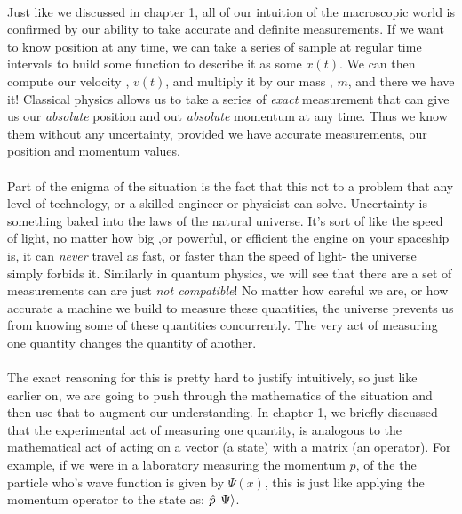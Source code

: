 \documentclass[12pt,letterpaper]{book}
\begin{document}
\paragraph*{}Just like we discussed in chapter 1, all of our intuition of the macroscopic world is confirmed by our ability to take accurate and definite measurements. If we want to know position at any time, we can take a series of sample at regular time intervals to build some function to describe it as some $x(t)$. We can then compute our velocity , $v(t)$, and multiply it by our mass , $m$, and there we have it! Classical physics allows us to take a series of \textit{exact} measurement that can give us our \textit{absolute} position and out \textit{absolute} momentum at any time. Thus we know them without any uncertainty, provided we have accurate measurements, our position and momentum values.

\paragraph*{}Part of the enigma of the situation is the fact that this not to a problem that any level of technology, or a skilled engineer or physicist can solve. Uncertainty is something baked into the laws of the natural universe. It's sort of like the speed of light, no matter how big ,or powerful, or efficient the engine on your spaceship is, it can \textit{never} travel as fast, or faster than the speed of light- the universe simply forbids it. Similarly in quantum physics, we will see that there are a set of measurements can are just \textit{not compatible}! No matter how careful we are, or how accurate a machine we build to measure these quantities, the universe prevents us from knowing some of these quantities concurrently. The very act of measuring one quantity changes the quantity of another.

\paragraph*{}The exact reasoning for this is pretty hard to justify intuitively, so just like earlier on, we are going to push through the mathematics of the situation and then use that to augment our understanding. In chapter 1, we briefly discussed that the experimental act of measuring one quantity, is analogous to the mathematical act of acting on a vector (a state) with a matrix (an operator). For example, if we were in a laboratory measuring the momentum $p$, of the the particle who's wave function is given by $\Psi(x)$, this is just like applying the momentum operator to the state as: $\hat{p}\ket{\Psi}$.
\end{document}
